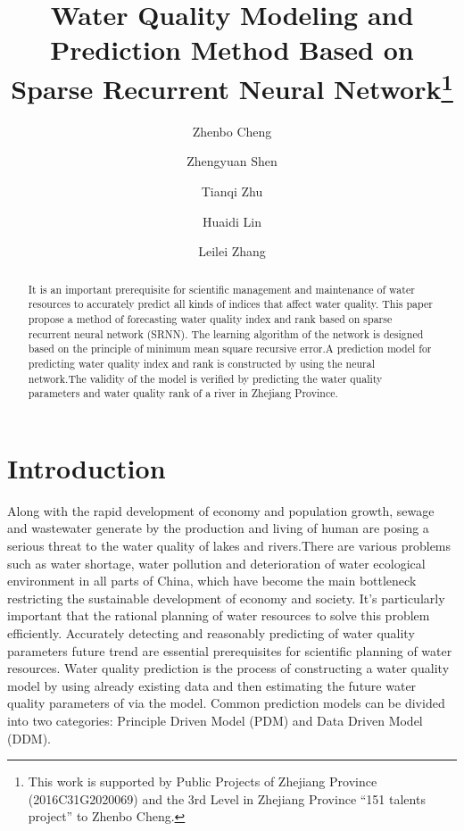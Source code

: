 \documentclass[runningheads]{llncs}
\begin{document}
%
\title{Water Quality Modeling and Prediction Method Based on Sparse Recurrent Neural Network\thanks{This work is supported by Public Projects of Zhejiang Province (2016C31G2020069) and the 3rd Level in Zhejiang Province “151 talents project” to Zhenbo Cheng.}}
%
%
\author{Zhenbo Cheng\inst{} \and
Zhengyuan Shen\inst{} \and
Tianqi Zhu\inst{}\and
Huaidi Lin\inst{}\and
Leilei Zhang\inst{}}
%
%
%
\maketitle              %
%
\begin{abstract}
It is an important prerequisite for scientific management and maintenance of water 
resources to accurately predict all kinds of indices that affect water quality. 
This paper propose a method of forecasting water quality index and rank based on sparse 
recurrent neural network (SRNN). The learning algorithm of the network is designed 
based on the principle of minimum mean square recursive error.A 
prediction model for predicting water quality index and rank is 
constructed by using the neural network.The validity of the model is verified 
by predicting the water quality parameters and water quality rank
of a river in Zhejiang Province.


\end{abstract}
%
%
%

\section{Introduction}
Along with the rapid development of economy and population growth, 
sewage and wastewater generate by the production and living of 
human are posing a serious threat to the water quality of lakes and 
rivers\cite{RN1}.There are various problems such as water shortage, water 
pollution and deterioration of water ecological environment in all 
parts of China\cite{RN1}, which have become the main bottleneck restricting the 
sustainable development of economy and society. 
It's particularly important that the rational planning 
of water resources to solve this problem efficiently\cite{RN2,RN3}. Accurately 
detecting and reasonably predicting of water quality parameters future trend
are essential prerequisites for scientific planning of water resources\cite{RN4}. 
Water quality prediction is the process of constructing a water quality model by using 
already existing data and then estimating the future water quality parameters of 
via the model. Common prediction models can be divided 
into two categories: Principle Driven Model (PDM) and Data Driven Model (DDM).
\end{document}
